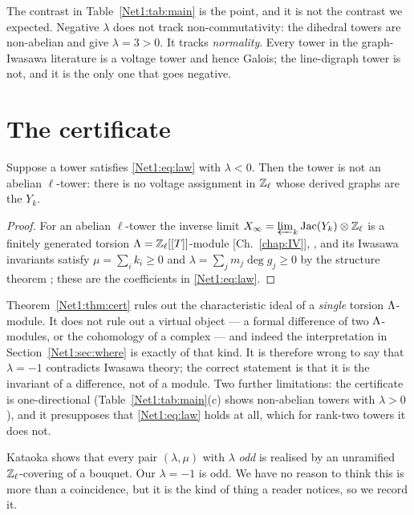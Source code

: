 The contrast in Table~\ref{Net1:tab:main} is the point, and it is not the contrast we expected.
Negative $\lambda$ does not track non-commutativity: the dihedral towers are non-abelian and
give $\lambda=3>0$. It tracks \emph{normality}. Every tower in the graph-Iwasawa literature
is a voltage tower and hence Galois; the line-digraph tower is not, and it is the only one
that goes negative.

\section{The certificate}\label{Net1:sec:cert}

\begin{theorem}\label{Net1:thm:cert}
Suppose a tower satisfies \eqref{Net1:eq:law} with $\lambda<0$. Then the tower is not an
abelian $\ell$-tower: there is no voltage assignment in $\mathbb{Z}_\ell$ whose derived graphs are the
$Y_k$.
\end{theorem}

\begin{proof}
For an abelian $\ell$-tower the inverse limit
$X_\infty=\varprojlim_k\operatorname{Jac}(Y_k)\otimes\mathbb{Z}_\ell$ is a finitely generated torsion
$\Lambda=\mathbb{Z}_\ell[[T]]$-module [Ch.~\ref{chap:IV}], \cite{Gonet22,MV24}, and its Iwasawa invariants
satisfy $\mu=\sum_ik_i\ge0$ and $\lambda=\sum_jm_j\deg g_j\ge0$ by the structure theorem
\cite[Thm.~13.12]{Washington}; these are the coefficients in \eqref{Net1:eq:law}.
\end{proof}

\begin{remark}\label{Net1:rem:caveat}
Theorem~\ref{Net1:thm:cert} rules out the characteristic ideal of a \emph{single} torsion
$\Lambda$-module. It does not rule out a virtual object --- a formal difference of two
$\Lambda$-modules, or the cohomology of a complex --- and indeed the interpretation in
Section~\ref{Net1:sec:where} is exactly of that kind. It is therefore wrong to say that
$\lambda=-1$ contradicts Iwasawa theory; the correct statement is that it is the invariant
of a difference, not of a module. Two further limitations: the certificate is
one-directional (Table~\ref{Net1:tab:main}(c) shows non-abelian towers with $\lambda>0$), and it
presupposes that \eqref{Net1:eq:law} holds at all, which for rank-two towers it does not.
\end{remark}

\begin{remark}\label{Net1:rem:parity}
Kataoka \cite{Kataoka26} shows that every pair $(\lambda,\mu)$ with $\lambda$ \emph{odd} is
realised by an unramified $\mathbb{Z}_\ell$-covering of a bouquet. Our $\lambda=-1$ is odd. We have no
reason to think this is more than a coincidence, but it is the kind of thing a reader
notices, so we record it.
\end{remark}


